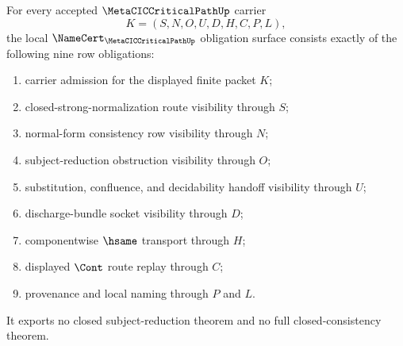 \begin{theorem}
\label{thm:metacic-critical-path-namecert-obligation-surface}
For every accepted $\MetaCICCriticalPathUp$ carrier
$$
K=(S,N,O,U,D,H,C,P,L),
$$
the local $\NameCert_{\MetaCICCriticalPathUp}$ obligation surface consists exactly of the following nine row obligations:
\begin{enumerate}
\item carrier admission for the displayed finite packet $K$;
\item closed-strong-normalization route visibility through $S$;
\item normal-form consistency row visibility through $N$;
\item subject-reduction obstruction visibility through $O$;
\item substitution, confluence, and decidability handoff visibility through $U$;
\item discharge-bundle socket visibility through $D$;
\item componentwise $\hsame$ transport through $H$;
\item displayed $\Cont$ route replay through $C$;
\item provenance and local naming through $P$ and $L$.
\end{enumerate}
It exports no closed subject-reduction theorem and no full closed-consistency theorem.
\end{theorem}
